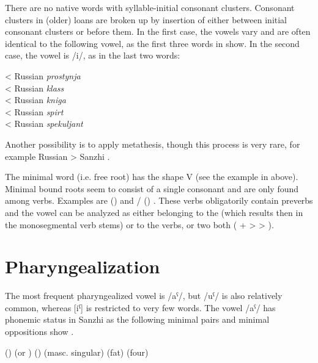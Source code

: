 There are no native words with syllable-initial consonant clusters. Consonant clusters in (older) loans are broken up by insertion of  either between initial consonant clusters or before them. In the first case, the vowels vary and are often identical to the following vowel, as the first three words in  show. In the second case, the vowel is /i/, as in the last two words:
%
\begin{exe}
	\ex	\label{ex:epenthesis phon}
	\TabPositions{11em}
	 	\tab 	< Russian \textit{prostynja}	\\
		 	\tab 	< Russian \textit{klass}	\\
		 		\tab 	< Russian \textit{kniga}	\\
		 	\tab < Russian \textit{spirt} \\
				  \tab  < Russian \textit{spekuljant} 		
\end{exe}

Another possibility is to apply metathesis, though this process is very rare, for example Russian  > Sanzhi  .

The minimal word (i.e. free root) has the shape V (see the example in  above). Minimal bound roots seem to consist of a single consonant and are only found among verbs. Examples are  ()  and \slash{} () . These verbs obligatorily contain preverbs and the vowel can be analyzed as either belonging to the  (which results then in the monosegmental verb stems) or to the verbs, or two both ( +  >  > ).



\section{Pharyngealization}
\label{sec:Pharyngealization}

The most frequent pharyngealized vowel is /aˁ/, but /uˁ/ is also relatively common, whereas [iˁ] is restricted to very few words. The vowel /aˁ/ has phonemic status in Sanzhi as the following minimal pairs and minimal oppositions show .
%
\begin{exe}
	\ex	\label{ex:pharyngealization minimal pairs A phon@A}
	\begin{xlist}
\TabPositions{13em}
		\ex	{}  \tab {} 
		\ex	{} ()  \tab {} 
		\ex	{}  \tab {} 
		\ex	{} (or ) () \tab {}  (masc. singular)
		\ex	{}  (fat) \tab {}  (four)
		\ex	{}  \tab {} 
	\end{xlist}
\end{exe}


